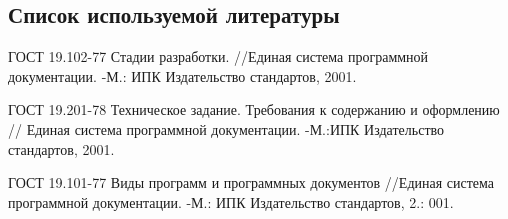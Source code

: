 \subsection{ Список используемой литературы}
\begin{my_enumerate}

\item
ГОСТ 19.102-77 Стадии разработки. //Единая система программной документации. -М.: ИПК Издательство стандартов, 2001.

\item
ГОСТ 19.201-78 Техническое задание. Требования к содержанию и оформлению // Единая система программной документации. -М.:ИПК Издательство стандартов, 2001.

\item
ГОСТ 19.101-77 Виды программ и программных документов
//Единая система программной документации. -М.: ИПК Издательство стандартов, 2.: 001.

\end{my_enumerate}

